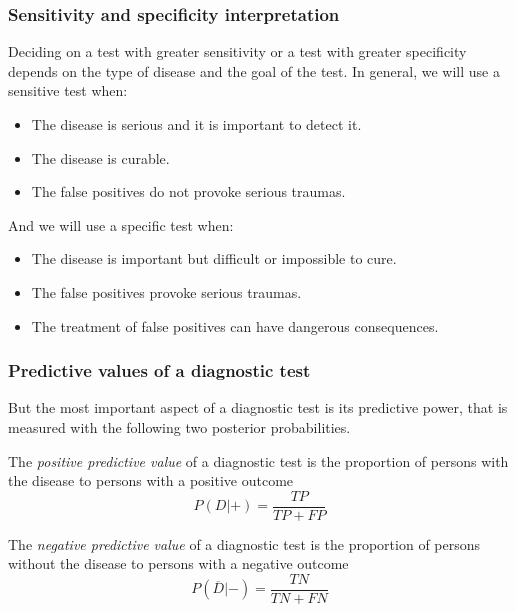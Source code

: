 \begin{frame}
\frametitle{Sensitivity and specificity interpretation}
Deciding on a test with greater sensitivity or a test with greater specificity depends on the type of disease and the
goal of the test.
In general, we will use a sensitive test when:
\begin{itemize}
\item The disease is serious and it is important to detect it. 
\item The disease is curable. 
\item The false positives do not provoke serious traumas.
\end{itemize}

And we will use a specific test when:
\begin{itemize}
\item The disease is important but difficult or impossible to cure.
\item The false positives provoke serious traumas. 
\item The treatment of false positives can have dangerous consequences.  
\end{itemize}
\end{frame}


\begin{frame}
\frametitle{Predictive values of a diagnostic test}
But the most important aspect of a diagnostic test is its predictive power, that is measured with the following two posterior probabilities.
\begin{definition}
The \emph{positive predictive value} of a diagnostic test is the proportion of persons with the disease to persons with a positive outcome
\[
P(D|+) = \frac{TP}{TP+FP}
\]
\end{definition}

\begin{definition}
The \emph{negative predictive value} of a diagnostic test is the proportion of persons without the disease to persons with a negative outcome 
\[
P(\overline{D}|-) = \frac{TN}{TN+FN}
\]
\end{definition}
\end{frame}


